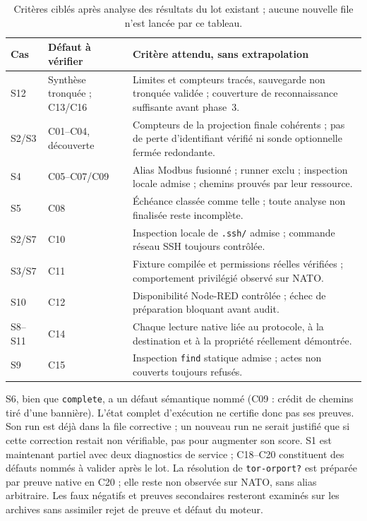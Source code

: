 \documentclass[11pt,a4paper]{article}
\newcommand{\code}[1]{{\urlstyle{tt}\nolinkurl{#1}}}
\begin{document}
\begin{table}[H]
\centering\small
\caption{Critères ciblés après analyse des résultats du lot existant ; aucune nouvelle file n'est lancée par ce tableau.}
\label{tab:criteres}
\begin{tabularx}{\linewidth}{l Y Y}
\toprule
Cas & Défaut à vérifier & Critère attendu, sans extrapolation \\
\midrule
S12 & Synthèse tronquée ; C13/C16 & Limites et compteurs tracés, sauvegarde non tronquée validée ; couverture de reconnaissance suffisante avant phase~3. \\
S2/S3 & C01--C04, découverte & Compteurs de la projection finale cohérents ; pas de perte d'identifiant vérifié ni sonde optionnelle fermée redondante. \\
S4 & C05--C07/C09 & Alias Modbus fusionné ; runner exclu ; inspection locale admise ; chemins prouvés par leur ressource. \\
S5 & C08 & Échéance classée comme telle ; toute analyse non finalisée reste incomplète. \\
S2/S7 & C10 & Inspection locale de \code{.ssh/} admise ; commande réseau SSH toujours contrôlée. \\
S3/S7 & C11 & Fixture compilée et permissions réelles vérifiées ; comportement privilégié observé sur NATO. \\
S10 & C12 & Disponibilité Node-RED contrôlée ; échec de préparation bloquant avant audit. \\
S8--S11 & C14 & Chaque lecture native liée au protocole, à la destination et à la propriété réellement démontrée. \\
S9 & C15 & Inspection \code{find} statique admise ; actes non couverts toujours refusés. \\
\bottomrule
\end{tabularx}
\end{table}

S6, bien que \code{complete}, a un défaut sémantique nommé (C09 : crédit de chemins tiré d'une bannière). L'état complet d'exécution ne certifie donc pas ses preuves. Son run est déjà dans la file corrective ; un nouveau run ne serait justifié que si cette correction restait non vérifiable, pas pour augmenter son score. S1 est maintenant partiel avec deux diagnostics de service ; C18--C20 constituent des défauts nommés à valider après le lot. La résolution de \code{tor-orport?} est préparée par preuve native en C20 ; elle reste non observée sur NATO, sans alias arbitraire. Les faux négatifs et preuves secondaires resteront examinés sur les archives sans assimiler rejet de preuve et défaut du moteur.
\end{document}
